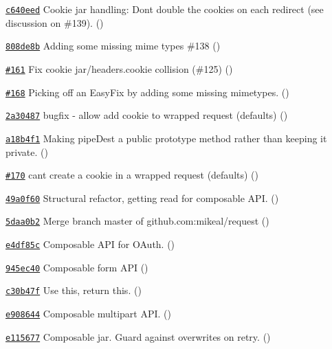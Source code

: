 \begin{DoxyItemize}
\item \href{https://github.com/mikeal/request/commit/c640eed292c06eac3ec89f60031ddf0fc0add732}{\tt c640eed} Cookie jar handling\+: Don\textquotesingle{}t double the cookies on each redirect (see discussion on \#139). ()
\item \href{https://github.com/mikeal/request/commit/808de8b0ba49d4bb81590ec37a873e6be4d9a416}{\tt 808de8b} Adding some missing mime types \#138 ()
\item \href{https://github.com/mikeal/request/pull/161}{\tt \#161} Fix cookie jar/headers.\+cookie collision (\#125) ()
\item \href{https://github.com/mikeal/request/pull/168}{\tt \#168} Picking off an Easy\+Fix by adding some missing mimetypes. ()
\item \href{https://github.com/mikeal/request/commit/2a304879f4218c1e46195d882bc81c0f874be329}{\tt 2a30487} bugfix -\/ allow add cookie to wrapped request (defaults) ()
\item \href{https://github.com/mikeal/request/commit/a18b4f14559f56cf52ca1b421daa6a934d28d51b}{\tt a18b4f1} Making pipe\+Dest a public prototype method rather than keeping it private. ()
\item \href{https://github.com/mikeal/request/pull/170}{\tt \#170} can\textquotesingle{}t create a cookie in a wrapped request (defaults) ()
\item \href{https://github.com/mikeal/request/commit/49a0f604779c91dd1759a02cbb195ccbd8d73f5d}{\tt 49a0f60} Structural refactor, getting read for composable A\+P\+I. ()
\item \href{https://github.com/mikeal/request/commit/5daa0b28b06cf109614f19e76b0e0b9b25ee3baf}{\tt 5daa0b2} Merge branch \textquotesingle{}master\textquotesingle{} of github.\+com\+:mikeal/request ()
\item \href{https://github.com/mikeal/request/commit/e4df85c72221bf09ee7e1eb54f6c881851bd4164}{\tt e4df85c} Composable A\+P\+I for O\+Auth. ()
\item \href{https://github.com/mikeal/request/commit/945ec40baef968ddd468c3b4dfce01621e4a0e31}{\tt 945ec40} Composable form A\+P\+I ()
\item \href{https://github.com/mikeal/request/commit/c30b47f229522a75af85da269157377b4a7dc37d}{\tt c30b47f} Use this, return this. ()
\item \href{https://github.com/mikeal/request/commit/e908644a69f9107b954f13635736f1e640216aec}{\tt e908644} Composable multipart A\+P\+I. ()
\item \href{https://github.com/mikeal/request/commit/e115677b1a03576eb96386986c350f211a4f38cd}{\tt e115677} Composable jar. Guard against overwrites on retry. ()

\end{DoxyItemize}
